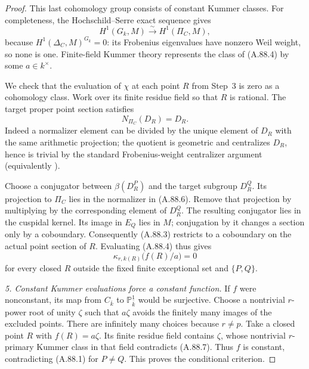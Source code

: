 \documentclass[11pt]{article}
\begin{document}
\begin{proof}
This last cohomology group consists of constant
Kummer classes. For completeness, the
Hochschild--Serre exact sequence gives
\[
 H^1(G_k,M)\xrightarrow{\sim}H^1(\Pi_C,M),
                                                        \tag{A.88.5}
\]
because \(H^1(\Delta_C,M)^{G_k}=0\): its
Frobenius eigenvalues have nonzero Weil weight,
so none is one. Finite-field
Kummer theory represents the class of (A.88.4) by
some \(a\in k^\times\).

We check that the evaluation of \(\chi\) at
each point \(R\) from Step~3 is zero as a
cohomology class. Work over its finite residue
field so that \(R\) is rational. The target
proper point section satisfies
\[
                       N_{\Pi_C}(D_R)=D_R.
                                                        \tag{A.88.6}
\]
Indeed a normalizer element can be divided by
the unique element of \(D_R\) with the same
arithmetic projection; the quotient is geometric
and centralizes \(D_R\), hence is trivial by
the standard Frobenius-weight centralizer
argument (equivalently
\cite[Lemma~1.7]{AR_ST2009}).

Choose a conjugator between
\(\beta(D_R^P)\) and the target subgroup
\(D_R^Q\). Its projection to \(\Pi_C\)
lies in the normalizer in (A.88.6). Remove that
projection by multiplying by the corresponding
element of \(D_R^Q\). The resulting conjugator
lies in the cuspidal kernel. Its image in
\(E_Q\) lies in \(M\); conjugation by it
changes a section only by a coboundary.
Consequently (A.88.3) restricts to a coboundary
on the actual point section of \(R\).
Evaluating (A.88.4) thus gives
\[
       \kappa_{r,k(R)}\bigl(f(R)/a\bigr)=0
                                                        \tag{A.88.7}
\]
for every closed \(R\) outside the fixed finite
exceptional set and \(\{P,Q\}\).

\emph{5. Constant Kummer evaluations force a
constant function.}
If \(f\) were nonconstant, its map from
\(C_{\bar k}\) to \(\mathbb P^1_{\bar k}\)
would be surjective. Choose a nontrivial
\(r\)-power root of unity \(\zeta\) such that
\(a\zeta\) avoids the finitely many images
of the excluded points. There are infinitely
many choices because \(r\ne p\).
Take a closed point \(R\) with
\(f(R)=a\zeta\). Its finite residue field
contains \(\zeta\), whose nontrivial
\(r\)-primary Kummer class in that field
contradicts (A.88.7). Thus \(f\) is constant,
contradicting (A.88.1) for \(P\ne Q\).
This proves the conditional criterion.
\end{proof}
\end{document}
